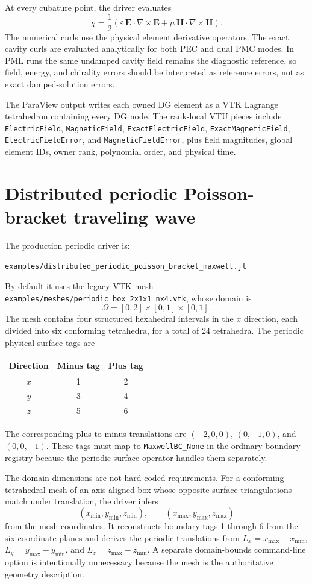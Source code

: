 \documentclass[11pt,oneside]{book}
\newcommand{\code}[1]{\texttt{#1}}
\newcommand{\vect}[1]{\boldsymbol{#1}}
\begin{document}
At every cubature point, the driver evaluates
\[
  \chi =
  \frac{1}{2}\left(
    \varepsilon\,\vect E\cdot\nabla\times\vect E
    +\mu\,\vect H\cdot\nabla\times\vect H
  \right).
\]
The numerical curls use the physical element derivative operators. The exact
cavity curls are evaluated analytically for both PEC and dual PMC modes. In
PML runs the same undamped cavity field remains the diagnostic reference, so
field, energy, and chirality errors should be interpreted as reference
errors, not as exact damped-solution errors.

The ParaView output writes each owned DG element as a VTK Lagrange tetrahedron
containing every DG node. The rank-local VTU pieces include
\code{ElectricField}, \code{MagneticField}, \code{ExactElectricField},
\code{ExactMagneticField}, \code{ElectricFieldError}, and
\code{MagneticFieldError}, plus field magnitudes, global element IDs, owner
rank, polynomial order, and physical time.

\section{Distributed periodic Poisson-bracket traveling wave}

The production periodic driver is:
\begin{lstlisting}[language=bash]
examples/distributed_periodic_poisson_bracket_maxwell.jl
\end{lstlisting}
By default it uses the legacy VTK mesh
\code{examples/meshes/periodic\_box\_2x1x1\_nx4.vtk}, whose domain is
\[
  \Omega=[0,2]\times[0,1]\times[0,1].
\]
The mesh contains four structured hexahedral intervals in the $x$ direction,
each divided into six conforming tetrahedra, for a total of 24 tetrahedra.
The periodic physical-surface tags are
\begin{center}
\begin{tabular}{ccc}
\toprule
Direction & Minus tag & Plus tag \\
\midrule
$x$ & 1 & 2 \\
$y$ & 3 & 4 \\
$z$ & 5 & 6 \\
\bottomrule
\end{tabular}
\end{center}
The corresponding plus-to-minus translations are
$(-2,0,0)$, $(0,-1,0)$, and $(0,0,-1)$. These tags must map to
\code{MaxwellBC\_None} in the ordinary boundary registry because the periodic
surface operator handles them separately.

The domain dimensions are not hard-coded requirements. For a conforming
tetrahedral mesh of an axis-aligned box whose opposite surface triangulations
match under translation, the driver infers
\[
  (x_{\min},y_{\min},z_{\min}),\qquad
  (x_{\max},y_{\max},z_{\max})
\]
from the mesh coordinates. It reconstructs boundary tags 1 through 6 from the
six coordinate planes and derives the periodic translations from
$L_x=x_{\max}-x_{\min}$, $L_y=y_{\max}-y_{\min}$, and
$L_z=z_{\max}-z_{\min}$. A separate domain-bounds command-line option is
intentionally unnecessary because the mesh is the authoritative geometry
description.
\end{document}
